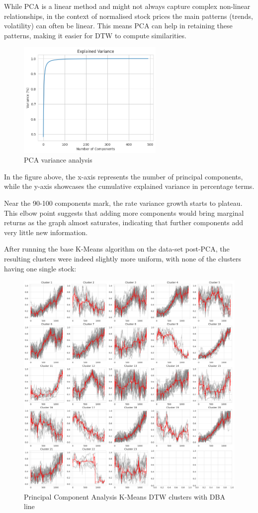 \documentclass[11pt]{article}
\begin{document}
 While PCA is a linear method and might not always capture complex non-linear relationships, in the context of normalised stock prices the main patterns (trends, volatility) can often be linear. This means PCA can help in retaining these patterns, making it easier for DTW to compute similarities.

\begin{figure}[H]
\centering
\includegraphics[width=7cm]{img/pca-variance.png} 
\caption{PCA variance analysis}

\end{figure}

 In the figure above, the x-axis represents the number of principal components, while the y-axis showcases the cumulative explained variance in percentage terms. 
 
 Near the  90-100 components mark, the rate variance growth starts to plateau. This elbow point suggests that adding more components would bring marginal returns as the graph almost saturates, indicating that further components add very little new information.



 After running the base K-Means algorithm on the data-set post-PCA, the resulting clusters were indeed slightly more uniform, with none of the clusters having one single stock:

\begin{figure}[H]
\centering
\includegraphics[width=12cm]{img/dbapca.png} 
\caption{Principal Component Analysis K-Means DTW clusters with DBA line}

\end{figure}
\end{document}
